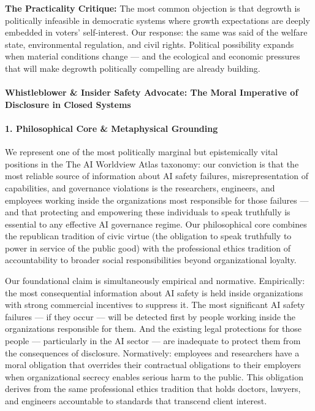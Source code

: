 \textbf{The Practicality Critique:} The most common objection is that
degrowth is politically infeasible in democratic systems where growth
expectations are deeply embedded in voters' self-interest. Our response:
the same was said of the welfare state, environmental regulation, and
civil rights. Political possibility expands when material conditions
change --- and the ecological and economic pressures that will make
degrowth politically compelling are already building.

\paragraph{Whistleblower \& Insider Safety Advocate: The Moral
Imperative of Disclosure in Closed
Systems}\label{whistleblower-insider-safety-advocate-the-moral-imperative-of-disclosure-in-closed-systems}

\paragraph{1. Philosophical Core \& Metaphysical
Grounding}\label{philosophical-core-metaphysical-grounding-7}

We represent one of the most politically marginal but epistemically
vital positions in the The AI Worldview Atlas taxonomy: our conviction
is that the most reliable source of information about AI safety
failures, misrepresentation of capabilities, and governance violations
is the researchers, engineers, and employees working inside the
organizations most responsible for those failures --- and that
protecting and empowering these individuals to speak truthfully is
essential to any effective AI governance regime. Our philosophical core
combines the republican tradition of civic virtue (the obligation to
speak truthfully to power in service of the public good) with the
professional ethics tradition of accountability to broader social
responsibilities beyond organizational loyalty.

Our foundational claim is simultaneously empirical and normative.
Empirically: the most consequential information about AI safety is held
inside organizations with strong commercial incentives to suppress it.
The most significant AI safety failures --- if they occur --- will be
detected first by people working inside the organizations responsible
for them. And the existing legal protections for those people ---
particularly in the AI sector --- are inadequate to protect them from
the consequences of disclosure. Normatively: employees and researchers
have a moral obligation that overrides their contractual obligations to
their employers when organizational secrecy enables serious harm to the
public. This obligation derives from the same professional ethics
tradition that holds doctors, lawyers, and engineers accountable to
standards that transcend client interest.

